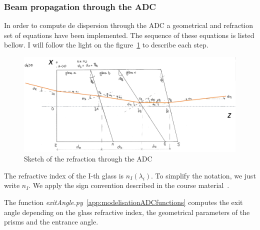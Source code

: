 \subsubsection{Beam propagation through the ADC}
In order to compute de dispersion through the ADC a geometrical and refraction set of equations have been implemented. The sequence of these equations is listed bellow. I will follow the light on the figure~\ref{fig:ADCgeometrie} to describe each step.
\begin{figure}[H]
\centering
	\includegraphics[width = \textwidth]{images/ADCgeometrie.png}
	\caption{Sketch of the refraction through the ADC}\label{fig:ADCgeometrie}
	\centering
\end{figure}
The refractive index of the I-th glass is $n_I(\lambda_i)$. To simplify the notation, we just write $n_I$.
We apply the sign convention described in the course material~\cite{coursOptLJT}.

The function \textit{exitAngle.py}~\ref{app:modelisationADCfunctions} computes the exit angle depending on the glass refractive index, the geometrical parameters of the prisms and the entrance angle.\\


